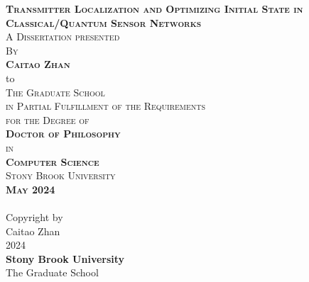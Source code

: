 \begin{center}
    
    \thispagestyle{empty}
    {\large \textsc{\textbf{Transmitter Localization and Optimizing Initial State in Classical/Quantum Sensor Networks}}}  \\
    \vspace{0.9cm}
    \textsc{A Dissertation presented}  \\
    \vspace{0.45cm}
    \textsc{By}  \\
    \vspace{0.45cm}
    {\large \textsc{\textbf{Caitao Zhan}}}  \\
    \vspace{0.9cm}
    to  \\
    \vspace{0.45cm}
    \textsc{The Graduate School}  \\
    \vspace{0.45cm}
    \textsc{in Partial Fulfillment of the Requirements}  \\
    \vspace{0.45cm}
    \textsc{for the Degree of}  \\
    \vspace{0.45cm}
    \textsc{\textbf{Doctor of Philosophy}}  \\
    \vspace{0.45cm}
    \textsc{in}  \\
    \vspace{0.45cm}
    \textsc{\textbf{Computer Science}}  \\
    \vspace{1.2cm}
    \textsc{Stony Brook University}  \\
    \vspace{1.2cm}
    \textsc{\textbf{May 2024}}  \\
    \eject 
    \thispagestyle{empty}
    \ \\
    \vfill
    Copyright by \\
    Caitao Zhan \\
    2024 \\
    \eject
    \setcounter{page}{2}
    {\large \textbf{Stony Brook University}}  \\
    \vspace{0.25cm}
    The Graduate School  \\

\end{center}
